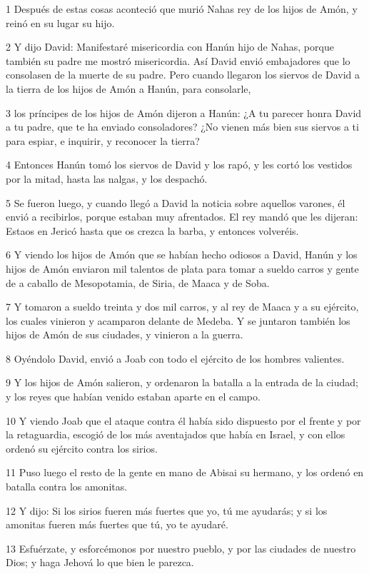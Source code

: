 \par 1 Después de estas cosas aconteció que murió Nahas rey de los hijos de Amón, y reinó en su lugar su hijo.
\par 2 Y dijo David: Manifestaré misericordia con Hanún hijo de Nahas, porque también su padre me mostró misericordia. Así David envió embajadores que lo consolasen de la muerte de su padre. Pero cuando llegaron los siervos de David a la tierra de los hijos de Amón a Hanún, para consolarle,
\par 3 los príncipes de los hijos de Amón dijeron a Hanún: ¿A tu parecer honra David a tu padre, que te ha enviado consoladores? ¿No vienen más bien sus siervos a ti para espiar, e inquirir, y reconocer la tierra?
\par 4 Entonces Hanún tomó los siervos de David y los rapó, y les cortó los vestidos por la mitad, hasta las nalgas, y los despachó.
\par 5 Se fueron luego, y cuando llegó a David la noticia sobre aquellos varones, él envió a recibirlos, porque estaban muy afrentados. El rey mandó que les dijeran: Estaos en Jericó hasta que os crezca la barba, y entonces volveréis.
\par 6 Y viendo los hijos de Amón que se habían hecho odiosos a David, Hanún y los hijos de Amón enviaron mil talentos de plata   para tomar a sueldo carros y gente de a caballo de Mesopotamia, de Siria, de Maaca y de Soba.
\par 7 Y tomaron a sueldo treinta y dos mil carros, y al rey de Maaca y a su ejército, los cuales vinieron y acamparon delante de Medeba. Y se juntaron también los hijos de Amón de sus ciudades, y vinieron a la guerra.
\par 8 Oyéndolo David, envió a Joab con todo el ejército de los hombres valientes.
\par 9 Y los hijos de Amón salieron, y ordenaron la batalla a la entrada de la ciudad; y los reyes que habían venido estaban aparte en el campo.
\par 10 Y viendo Joab que el ataque contra él había sido dispuesto por el frente y por la retaguardia, escogió de los más aventajados que había en Israel, y con ellos ordenó su ejército contra los sirios.
\par 11 Puso luego el resto de la gente en mano de Abisai su hermano, y los ordenó en batalla contra los amonitas.
\par 12 Y dijo: Si los sirios fueren más fuertes que yo, tú me ayudarás; y si los amonitas fueren más fuertes que tú, yo te ayudaré.
\par 13 Esfuérzate, y esforcémonos por nuestro pueblo, y por las ciudades de nuestro Dios; y haga Jehová lo que bien le parezca.
